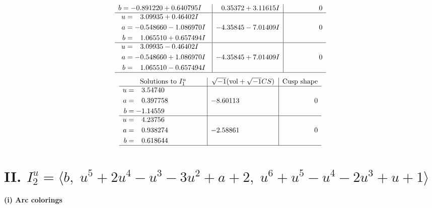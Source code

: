 \documentclass[1p]{elsarticle_modified}
\theoremstyle{definition}
\newcommand{\I}{\sqrt{-1}}
\begin{document}
$$\begin{array}{c|c|c}
\begin{aligned}
b &= -0.891220 + 0.640795 I\end{aligned}
 & \phantom{-}0.35372 + 3.11615 I & \phantom{-0.000000 } 0 \\ \hline\begin{aligned}
u &= \phantom{-}3.09935 + 0.46402 I \\
a &= -0.548660 - 1.086970 I \\
b &= \phantom{-}1.065510 + 0.657494 I\end{aligned}
 & -4.35845 - 7.01409 I & \phantom{-0.000000 } 0 \\ \hline\begin{aligned}
u &= \phantom{-}3.09935 - 0.46402 I \\
a &= -0.548660 + 1.086970 I \\
b &= \phantom{-}1.065510 - 0.657494 I\end{aligned}
 & -4.35845 + 7.01409 I & \phantom{-0.000000 } 0\\
 \hline 
 \end{array}$$\newpage$$\begin{array}{c|c|c}  
\text{Solutions to }I^u_{1}& \I (\text{vol} + \sqrt{-1}CS) & \text{Cusp shape}\\
 \hline 
\begin{aligned}
u &= \phantom{-}3.54740\phantom{ +0.000000I} \\
a &= \phantom{-}0.397758\phantom{ +0.000000I} \\
b &= -1.14559\phantom{ +0.000000I}\end{aligned}
 & -8.60113\phantom{ +0.000000I} & \phantom{-0.000000 } 0 \\ \hline\begin{aligned}
u &= \phantom{-}4.23756\phantom{ +0.000000I} \\
a &= \phantom{-}0.938274\phantom{ +0.000000I} \\
b &= \phantom{-}0.618644\phantom{ +0.000000I}\end{aligned}
 & -2.58861\phantom{ +0.000000I} & \phantom{-0.000000 } 0\\
 \hline 
 \end{array}$$\newpage\newpage\renewcommand{\arraystretch}{1}
\centering \section*{II. $I^u_{2}= \langle b,\;u^5+2 u^4- u^3-3 u^2+a+2,\;u^6+u^5- u^4-2 u^3+u+1 \rangle$}
\flushleft \textbf{(i) Arc colorings}\\
\end{document}
